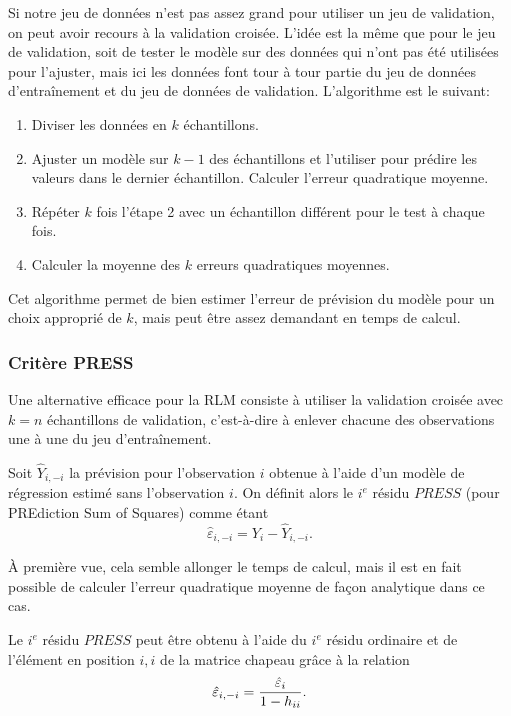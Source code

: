 Si notre jeu de données n'est pas assez grand pour utiliser un jeu de validation, on peut avoir recours à la validation croisée. L'idée est la même que pour le jeu de validation, soit de tester le modèle sur des données qui n'ont pas été utilisées pour l'ajuster, mais ici les données font tour à tour partie du jeu de données d'entraînement et du jeu de données de validation. L'algorithme est le suivant:\\

\begin{enumerate}
\item Diviser les données en $k$ échantillons.
\item Ajuster un modèle sur $k-1$ des échantillons et l'utiliser pour prédire les valeurs dans le dernier échantillon. Calculer l'erreur quadratique moyenne.
\item Répéter $k$ fois l'étape 2  avec un échantillon différent pour le test à chaque fois.
\item Calculer la moyenne des $k$ erreurs quadratiques moyennes.
\end{enumerate}

Cet algorithme permet de bien estimer l'erreur de prévision du modèle pour un choix approprié de $k$, mais peut être assez demandant en temps de calcul.


\subsubsection{Critère PRESS}

Une alternative efficace pour la RLM consiste à utiliser la validation croisée avec $k=n$ échantillons de validation, c'est-à-dire à enlever chacune des observations une à une du jeu d'entraînement.

Soit $\hat{Y}_{i,-i}$ la prévision pour l'observation $i$ obtenue à l'aide d'un modèle de régression estimé sans l'observation $i$. On définit alors le $i^e$ résidu $PRESS$ (pour PREdiction Sum of Squares) comme étant
$$\hat\varepsilon_{i,-i}=Y_i-\hat{Y}_{i,-i}.$$

À première vue, cela semble allonger le temps de calcul, mais il est en fait possible de calculer l'erreur quadratique moyenne de façon analytique dans ce cas.

\begin{theorem}
Le $i^e$ résidu $PRESS$ peut \^etre obtenu à l'aide du
$i^e$ résidu ordinaire et de l'élément en position $i,i$
de la matrice chapeau gr\^ace à la relation
$$\hat\varepsilon_{i,-i}={\hat\varepsilon_i\over1-h_{ii}}.$$
\end{theorem}

